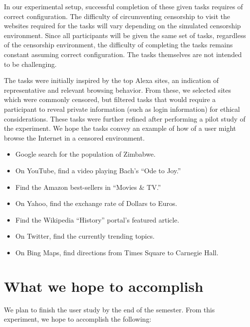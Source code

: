 \documentclass{template}
\begin{document}
In our experimental setup, successful completion of 
these given tasks requires of correct configuration.
The difficulty of circumventing  censorship to visit the 
websites required for the tasks will vary depending on the 
simulated censorship environment. Since all participants will be given the 
same set of tasks, regardless of the censorship environment, 
the difficulty of completing the tasks remains constant assuming
correct configuration. The tasks themselves are not intended to
be challenging.

The tasks were initially inspired by the top Alexa sites, 
an indication of representative and relevant browsing behavior. 
From these, we selected sites which were commonly censored, 
but filtered tasks that would require a participant to reveal private information 
(such as login information) for ethical considerations. These tasks
were further refined after performing a pilot study of the experiment. 
We hope the tasks convey an example of how of a user might 
browse the Internet in a censored environment. 

\begin{itemize} \itemsep1pt \parskip0pt 
\item Google search for the population of Zimbabwe. 
\item On YouTube, find a video playing Bach's ``Ode to Joy.''
\item Find the Amazon best-sellers in ``Movies \& TV.''
\item On Yahoo, find the exchange rate of Dollars to Euros.
\item Find the Wikipedia ``History'' portal's featured article. 
\item On Twitter, find the currently trending topics.
\item On Bing Maps, find directions from Times Square to Carnegie Hall.
\end{itemize}

\section{What we hope to accomplish}

We plan to finish the user study by the end of the semester. 
From this experiment, we hope to accomplish the following: 
\end{document}
